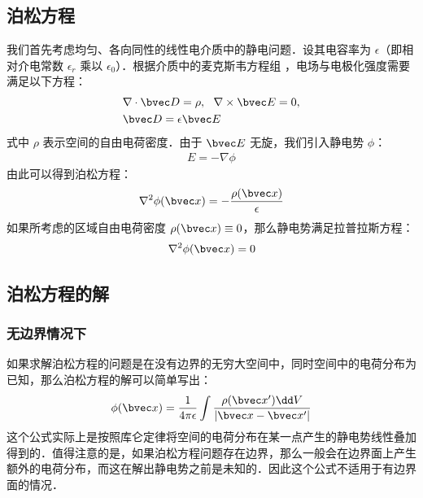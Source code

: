 


\subsection{泊松方程}
我们首先考虑均匀、各向同性的线性电介质中的静电问题．设其电容率为 $\epsilon$（即相对介电常数 $\epsilon_r$ 乘以 $\epsilon_0$）．根据介质中的麦克斯韦方程组 ，电场与电极化强度需要满足以下方程：
\begin{align}
&\nabla \cdot \bvec D = \rho,\ \ \nabla \times \bvec E = 0,\\
&\bvec D=\epsilon \bvec E
\end{align}
式中 $\rho$ 表示空间的自由电荷密度．由于 $\bvec E$ 无旋，我们引入静电势 $\phi$：
\begin{align}
E=-\nabla \phi
\end{align}
由此可以得到泊松方程：
\begin{align}
\nabla^2 \phi(\bvec x)=-\frac{\rho(\bvec x)}{\epsilon} \label{EPoiEQ_eq1}
\end{align}
如果所考虑的区域自由电荷密度 $\rho(\bvec x)\equiv 0$，那么静电势满足拉普拉斯方程：
\begin{align}
\nabla^2 \phi(\bvec x)=0
\end{align}

\subsection{泊松方程的解}
\subsubsection{无边界情况下}
如果求解泊松方程的问题是在没有边界的无穷大空间中，同时空间中的电荷分布为已知，那么泊松方程的解可以简单写出：
\begin{align}
\phi(\bvec x)=\frac{1}{4\pi \epsilon}\int \frac{\rho (\bvec x')\dd V}{|\bvec x-\bvec x'|}
\end{align}
这个公式实际上是按照库仑定律将空间的电荷分布在某一点产生的静电势线性叠加得到的．值得注意的是，如果泊松方程问题存在边界，那么一般会在边界面上产生额外的电荷分布，而这在解出静电势之前是未知的．因此这个公式不适用于有边界面的情况．

